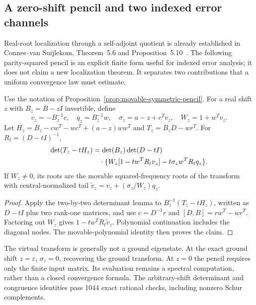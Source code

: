 \subsection{A zero-shift pencil and two indexed error channels}
\label{ssec:ritz-pencil-channels}

Real-root localization through a self-adjoint quotient is already
established in Connes--van Suijlekom, Theorem~5.6 and
Proposition~5.10~\cite{CvS2025}. The following parity-squared pencil
is an explicit finite form useful for indexed error analysis; it does
not claim a new localization theorem. It separates two contributions
that a uniform convergence law must estimate.

\begin{proposition}
\label{prop:arbitrary-shift-pencil}
Use the notation of Proposition~\ref{prop:movable-symmetric-pencil}.
For a real shift $z$ with $B_z=B-zI$ invertible, define
\[
 v_z=-B_z^{-1}c,\quad q_z=B_z^{-1}w,\quad
 \sigma_z=a-z+c^Tv_z,\quad W_z=1+w^Tv_z.
\]
Let $H_z=B_z-cw^T-wc^T+(a-z)ww^T$ and
$T_z=B_zD-wr^T$. For $R_t=(D-tI)^{-1}$,
\begin{align}
 \det(T_z-tH_z)
 &=\det(B_z)\det(D-tI)\notag\\
 &\quad\cdot\{W_z[1-tw^TR_tv_z]
              -t\sigma_z w^TR_tq_z\}.
 \label{eq:arbitrary-shift-determinant}
\end{align}
If $W_z\ne0$, its roots are the movable squared-frequency roots of
the transform with central-normalized tail
$\widetilde v_z=v_z+(\sigma_z/W_z)q_z$.
\end{proposition}
\begin{proof}
Apply the two-by-two determinant lemma to
$B_z^{-1}(T_z-tH_z)$, written as $D-tI$ plus two rank-one
matrices, and use $c=D^{-1}r$ and
$[D,B]=rw^T-wr^T$. Factoring out $W_z$ gives
$1-tw^TR_t\widetilde v_z$. Polynomial continuation includes the
diagonal nodes. The movable-polynomial identity then proves the claim.
\end{proof}
The virtual transform is generally not a ground eigenstate. At the
exact ground shift $z=\varepsilon$, $\sigma_z=0$, recovering the
ground transform. At $z=0$ the pencil requires only the finite input
matrix. Its evaluation remains a spectral computation, rather than a
closed convergence formula. The arbitrary-shift determinant and
congruence identities pass 1044 exact rational checks, including
nonzero Schur complements.

